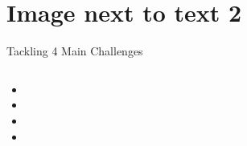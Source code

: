 \section[Example 2]{Image next to text 2}



\begin{frame}{Tackling 4 Main Challenges}
	\begin{columns}
		\begin{column}{0.4\textwidth}
			
			\begin{itemize}
				\item {}
				\item {}
				\item {}
				\item {}
			\end{itemize}
				
		\end{column}
		\begin{column}{0.6\textwidth}
			\only<1>{ %
				
			}
			\only<2>{ %
				
			}
			\only<3>{ %
				
			}
			\only<4>{ %
				
			}
		\end{column}
	\end{columns}
\end{frame}
